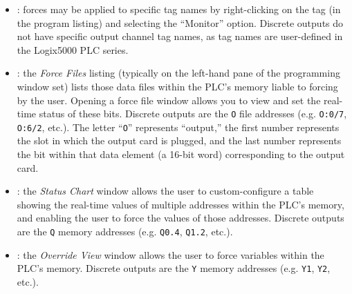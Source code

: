 \begin{itemize}
\item{} : forces may be applied to specific tag names by right-clicking on the tag (in the program listing) and selecting the ``Monitor'' option.  Discrete outputs do not have specific output channel tag names, as tag names are user-defined in the Logix5000 PLC series.
\vskip 5pt
\item{} : the {\it Force Files} listing (typically on the left-hand pane of the programming window set) lists those data files within the PLC's memory liable to forcing by the user.  Opening a force file window allows you to view and set the real-time status of these bits.  Discrete outputs are the {\tt O} file addresses (e.g. {\tt O:0/7}, {\tt O:6/2}, etc.).  The letter ``{\tt O}'' represents ``output,'' the first number represents the slot in which the output card is plugged, and the last number represents the bit within that data element (a 16-bit word) corresponding to the output card.
\vskip 5pt
\item{} : the {\it Status Chart} window allows the user to custom-configure a table showing the real-time values of multiple addresses within the PLC's memory, and enabling the user to force the values of those addresses.  Discrete outputs are the {\tt Q} memory addresses (e.g. {\tt Q0.4}, {\tt Q1.2}, etc.).
\vskip 5pt
\item{} : the {\it Override View} window allows the user to force variables within the PLC's memory.  Discrete outputs are the {\tt Y} memory addresses (e.g. {\tt Y1}, {\tt Y2}, etc.).
\end{itemize}

\eject
















